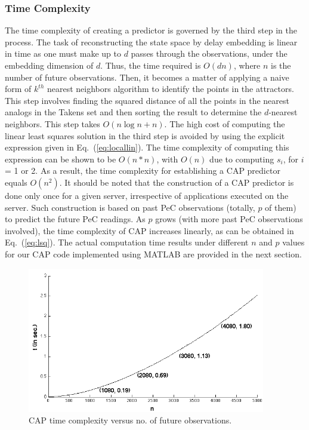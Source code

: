 \documentclass[acmtaco]{acmtrans2m}
\newcommand{\equationname}{Eq.}
\begin{document}
\subsubsection{Time Complexity}  
The time complexity of creating a predictor is governed by the third
step in the process.  The task of reconstructing the state space by
delay embedding is linear in time as one must make up to $d$ passes
through the observations, under the embedding dimension of $d$.
Thus, the time required is $O(dn)$, where $n$ is the number of future
observations.  Then, it becomes a matter of applying a naive form of
$k^{th}$ nearest neighbors algorithm to identify the points in the
attractors.  This step involves finding the squared distance of all the
points in the nearest analogs in the Takens set and then sorting the
result to determine the $d$-nearest neighbors.  This step takes
$O(n\log{n}+n)$.  The high cost of computing the linear least squares
solution in the third step is avoided by using the explicit expression
given in \equationname~(\ref{eq:locallin}).  The time complexity of computing this
expression can be shown to be $O(n*n)$, with $O(n)$ due to computing
$s_{i}$, for $i$ = 1 or 2.  As a result, the time complexity for
establishing a CAP predictor equals $O(n^{2})$.  It should be noted that
the construction of a CAP predictor is done only once for a given
server, irrespective of applications executed on the server.  Such
construction is based on past PeC observations (totally, $p$ of them)
to predict the future PeC readings.  As $p$ grows (with more past PeC
observations involved), the time complexity of CAP increases linearly,
as can be obtained in \equationname~(\ref{eq:lsq}).  The actual computation time
results under different $n$ and $p$ values for our CAP code implemented
using MATLAB are provided in the next section.
\begin{figure}[tp]
    \centering
    \includegraphics[width=0.9\linewidth,height=2.5in]{complexity}
    \caption{CAP time complexity versus no. of future observations.}
    \label{fig:complexity}
\end{figure}
\end{document}
